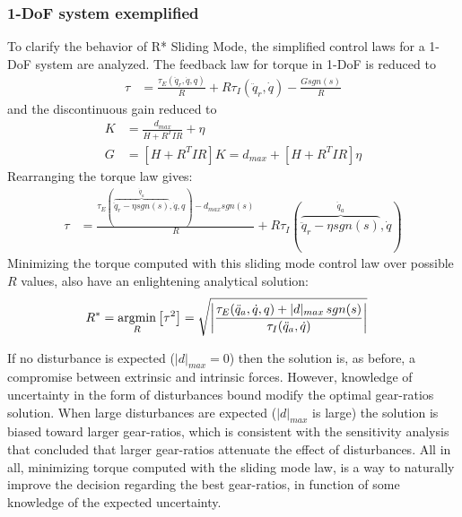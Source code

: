 \subsubsection{1-DoF system exemplified} 

To clarify the behavior of R* Sliding Mode, the simplified control laws for a 1-DoF system are analyzed. The feedback law for torque in 1-DoF is reduced to 
%
\begin{align}
	\tau &=  \frac{\tau_{E}(\ddot{q}_r,\dot{q},q)}{R} 
	+ R \tau_{I}(\ddot{q}_r,\dot{q})
  - \frac{G sgn( s ) }{R} 
\end{align}
%
and the discontinuous gain reduced to 
%
\begin{align}
K &= \frac{d_{max}}{H + R^T I R} + \eta \\
G &= \left[ H + R^T I R \right] K  =  d_{max} + \left[ H + R^T I R \right] \eta 
\end{align}
%
Rearranging the torque law gives:
%
\begin{align}
	\tau &=  \frac{\tau_{E}( \overbrace{ \ddot{q}_r - \eta sgn( s ) }^{\ddot{q}_a},\dot{q},q) - d_{max} sgn( s )  }{R} 
	+ R \tau_{I}(\overbrace{\ddot{q}_r - \eta sgn( s )}^{\ddot{q}_a} ,\dot{q})
\end{align}
%
Minimizing the torque computed with this sliding mode control law over possible $R$ values, also have an enlightening analytical solution:
%
\begin{align}
	R^{*} &= \operatornamewithlimits{argmin}\limits_{R} \left[ \tau^2 \right] = \sqrt{ \left | \frac{\tau_{E}(\ddot{q}_a,\dot{q},q) + | d |_{max} \, sgn( s ) }{\tau_{I}(\ddot{q}_a,\dot{q})} \right |   } 
\label{eq:rstar_sliding}
\end{align}

If no disturbance is expected ($| d |_{max}=0$) then the solution is, as before, a compromise between extrinsic and intrinsic forces. However, knowledge of uncertainty in the form of disturbances bound modify the optimal gear-ratios solution. When large disturbances are expected ($| d |_{max}$ is large) the solution is biased toward larger gear-ratios, which is consistent with the sensitivity analysis that concluded that larger gear-ratios attenuate the effect of disturbances. All in all, minimizing torque computed with the sliding mode law, is a way to naturally improve the decision regarding the best gear-ratios, in function of some knowledge of the expected uncertainty.
%

